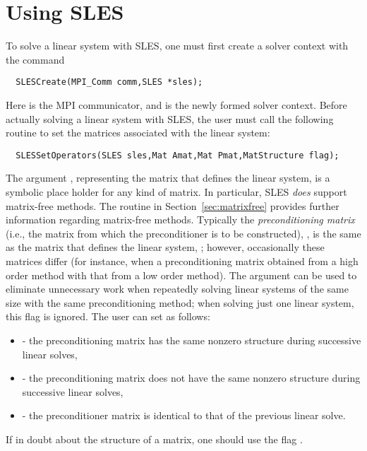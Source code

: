 \section{Using SLES} 
\label{sec:usingsles}

To solve a linear system with SLES, one must first create a solver context 
with the command 
\begin{verbatim}
  SLESCreate(MPI_Comm comm,SLES *sles); 
\end{verbatim}
Here  is the MPI communicator, and  is the newly
formed solver context.
Before actually solving a linear system with SLES, the user must call 
the following routine to set the matrices associated with the linear
system: 
\begin{verbatim}
  SLESSetOperators(SLES sles,Mat Amat,Mat Pmat,MatStructure flag);
\end{verbatim}
The argument , representing the matrix that defines the
linear system, is a symbolic place holder for any kind of matrix.  
In particular, SLES {\em does} support matrix-free methods. 
The routine  
in Section~\ref{sec:matrixfree} provides further information regarding
matrix-free methods. 
Typically the {\em preconditioning matrix} (i.e., the matrix from which the
preconditioner is to be constructed), , is the same as
the matrix that defines the linear system, ; however,
occasionally these matrices differ (for instance, 
when a preconditioning matrix obtained from a high order method with 
that from a low order method).
The argument  can be used to eliminate unnecessary work when
repeatedly solving linear systems of the same size with the same 
preconditioning method; when solving just one linear system, this flag is
ignored.  The user can set  as follows:
\begin{itemize}
\item {} - the preconditioning matrix has the
    same  nonzero structure during successive
    linear solves,
\item {} - the preconditioning matrix does
     not have the same nonzero structure during successive linear solves,
\item {} - the preconditioner matrix is identical
   to that of the previous linear solve. 
\end{itemize}
If in doubt about the structure of a matrix, one should use
the flag .
 
